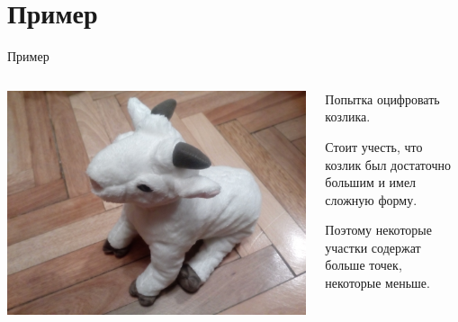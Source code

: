 \documentclass{beamer}
\begin{document}
\section{Пример}

\begin{frame}{Пример}
    \begin{columns}[T]
        \begin{column}[T]{7cm}
            \includegraphics[scale=0.06]{sheep}\\
        \end{column}
        \begin{column}[T]{5cm}
            Попытка оцифровать козлика.

            Стоит учесть, что козлик был достаточно большим и имел сложную форму. 

            Поэтому некоторые участки содержат больше точек, некоторые меньше.
        \end{column}
    \end{columns}
\end{frame}
\end{document}
